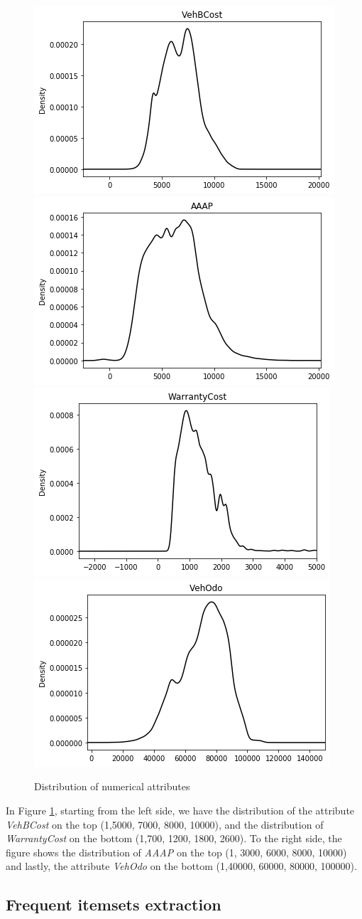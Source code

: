\documentclass{article}
\begin{document}
	\begin{figure}[H]
		\centering
		\includegraphics[width=.4\textwidth]{vehbcost}\hspace{1cm}
		\includegraphics[width=.4\textwidth]{AAAP}
		\includegraphics[width=.4\textwidth]{warrantycost}\hspace{1cm}
		\includegraphics[width=.4\textwidth]{vehodo}
		\caption{Distribution of numerical attributes}
		\label{fig:hyper_rf}
	\end{figure}
	
	In Figure \ref{fig:hyper_rf}, starting from the left side, we have the distribution of the attribute \emph{VehBCost} on the top (1,5000, 7000, 8000, 10000), and the distribution of \emph{WarrantyCost} on the bottom (1,700, 1200, 1800, 2600). 
	To the right side, the figure shows the distribution of \emph{AAAP} on the top (1, 3000, 6000, 8000, 10000) and lastly, the attribute \emph{VehOdo} on the bottom (1,40000, 60000, 80000, 100000). 
	
	\subsection{Frequent itemsets extraction}
	
\end{document}
